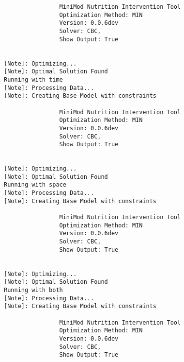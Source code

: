 \documentclass[
]{article}
\begin{document}
\begin{verbatim}
                MiniMod Nutrition Intervention Tool
                Optimization Method: MIN
                Version: 0.0.6dev
                Solver: CBC,
                Show Output: True
                
                
[Note]: Optimizing...
[Note]: Optimal Solution Found
Running with time
[Note]: Processing Data...
[Note]: Creating Base Model with constraints

                MiniMod Nutrition Intervention Tool
                Optimization Method: MIN
                Version: 0.0.6dev
                Solver: CBC,
                Show Output: True
                
                
[Note]: Optimizing...
[Note]: Optimal Solution Found
Running with space
[Note]: Processing Data...
[Note]: Creating Base Model with constraints

                MiniMod Nutrition Intervention Tool
                Optimization Method: MIN
                Version: 0.0.6dev
                Solver: CBC,
                Show Output: True
                
                
[Note]: Optimizing...
[Note]: Optimal Solution Found
Running with both
[Note]: Processing Data...
[Note]: Creating Base Model with constraints

                MiniMod Nutrition Intervention Tool
                Optimization Method: MIN
                Version: 0.0.6dev
                Solver: CBC,
                Show Output: True
                

\end{verbatim}
\end{document}
